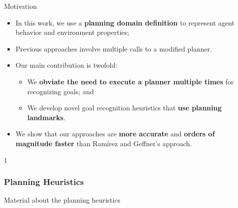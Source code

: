\documentclass{beamer}
\def\masterclass{1}
\begin{document}
    \begin{frame}{Motivation}
       	\begin{itemize}
			\item In this work, we use a \textbf{planning domain definition} to represent agent behavior and environment properties;
			\item Previous approaches involve multiple calls to a modified planner.
			\item Our main contribution is twofold:
				\begin{itemize}
					\item We \textbf{obviate the need to execute a planner multiple times} for recognizing goals; and
					\item We develop novel goal recognition heuristics that \textbf{use planning landmarks}.
				 \end{itemize}
			\item We show that our approaches are \textbf{more accurate} and \textbf{orders of magnitude faster} than Ramírez and Geffner's approach.
		\end{itemize}
    \end{frame}

\if\masterclass1
	\begin{frame}[c]\frametitle{Planning Heuristics}
		Material about the planning heuristics
	\end{frame}
	
\end{document}

